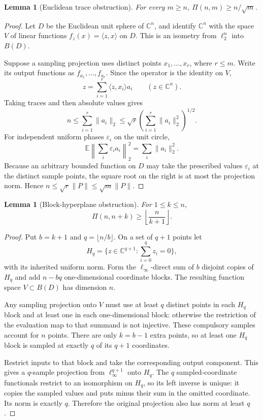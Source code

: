 \documentclass[11pt]{article}
\newtheorem{lemma}[theorem]{Lemma}
\newcommand{\C}{\mathbb C}
\begin{document}
\begin{lemma}[Euclidean trace obstruction]\label{lem:euclidean}
For every $m\geq n$, $\Pi(n,m)\geq n/\sqrt m$.
\end{lemma}

\begin{proof}
Let $D$ be the Euclidean unit sphere of $\C^n$, and identify $\C^n$ with the
space $V$ of linear functions $f_z(x)=\langle z,x\rangle$ on $D$.  This is
an isometry from $\ell_2^n$ into $B(D)$.

Suppose a sampling projection uses distinct points $x_1,\dots,x_r$, where
$r\leq m$.  Write its output functions as $f_{a_1},\dots,f_{a_r}$.  Since
the operator is the identity on $V$,
\begin{equation}\label{eq:identity-decomp}
 z=\sum_{i=1}^r\langle z,x_i\rangle a_i
 \qquad(z\in\C^n).
\end{equation}
Taking traces and then absolute values gives
\[
 n\leq\sum_{i=1}^r\|a_i\|_2
 \leq\sqrt r\left(\sum_{i=1}^r\|a_i\|_2^2\right)^{1/2}.
\]
For independent uniform phases $\varepsilon_i$ on the unit circle,
\[
 \mathbb E\left\|\sum_i\varepsilon_i a_i\right\|_2^2
 =\sum_i\|a_i\|_2^2.
\]
Because an arbitrary bounded function on $D$ may take the prescribed values
$\varepsilon_i$ at the distinct sample points, the square root on the
right is at most the projection norm.  Hence
$n\leq\sqrt r\|P\|\leq\sqrt m\|P\|$.
\end{proof}

\begin{lemma}[Block-hyperplane obstruction]\label{lem:block}
For $1\leq k\leq n$,
\[
 \Pi(n,n+k)\geq\left\lfloor\frac{n}{k+1}\right\rfloor.
\]
\end{lemma}

\begin{proof}
Put $b=k+1$ and $q=\lfloor n/b\rfloor$.  On a set of $q+1$ points let
\[
 H_q=\{z\in\C^{q+1}:\textstyle\sum_{i=0}^qz_i=0\},
\]
with its inherited uniform norm.  Form the $\ell_\infty$-direct sum of $b$
disjoint copies of $H_q$ and add $n-bq$ one-dimensional coordinate blocks.
The resulting function space $V\subset B(D)$ has dimension $n$.

Any sampling projection onto $V$ must use at least $q$ distinct points in
each $H_q$ block and at least one in each one-dimensional block: otherwise
the restriction of the evaluation map to that summand is not injective.
These compulsory samples account for $n$ points.  There are only $k=b-1$
extra points, so at least one $H_q$ block is sampled at exactly $q$ of its
$q+1$ coordinates.

Restrict inputs to that block and take the corresponding output component.
This gives a $q$-sample projection from $\ell_\infty^{q+1}$ onto $H_q$.
The $q$ sampled-coordinate functionals restrict to an isomorphism on
$H_q$, so its left inverse is unique: it copies the sampled values and puts
minus their sum in the omitted coordinate.  Its norm is exactly $q$.
Therefore the original projection also has norm at least $q$.
\end{proof}
\end{document}

